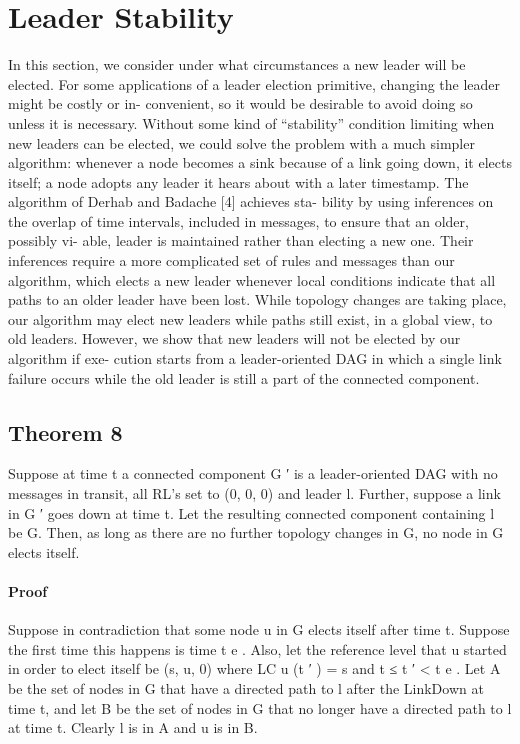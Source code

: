 \documentclass{article}
\begin{document}
\section{Leader Stability}
In this section, we consider under what circumstances a
new leader will be elected. For some applications of a leader
election primitive, changing the leader might be costly or in-
convenient, so it would be desirable to avoid doing so unless
it is necessary. Without some kind of “stability” condition
limiting when new leaders can be elected, we could solve
the problem with a much simpler algorithm: whenever a
node becomes a sink because of a link going down, it elects
itself; a node adopts any leader it hears about with a later
timestamp.
The algorithm of Derhab and Badache [4] achieves sta-
bility by using inferences on the overlap of time intervals,
included in messages, to ensure that an older, possibly vi-
able, leader is maintained rather than electing a new one.
Their inferences require a more complicated set of rules
and messages than our algorithm, which elects a new leader
whenever local conditions indicate that all paths to an older
leader have been lost. While topology changes are taking
place, our algorithm may elect new leaders while paths still
exist, in a global view, to old leaders. However, we show
that new leaders will not be elected by our algorithm if exe-
cution starts from a leader-oriented DAG in which a single
link failure occurs while the old leader is still a part of the
connected component.
\subsection{Theorem 8}
Suppose at time t a connected component G ′ is
a leader-oriented DAG with no messages in transit, all RL’s
set to (0, 0, 0) and leader l. Further, suppose a link in G ′
goes down at time t. Let the resulting connected component
containing l be G. Then, as long as there are no further
topology changes in G, no node in G elects itself.
\paragraph{Proof}
Suppose in contradiction that some node u in G
elects itself after time t. Suppose the first time this happens
is time t e . Also, let the reference level that u started in order
to elect itself be (s, u, 0) where LC u (t ′ ) = s and t ≤ t ′ < t e .
Let A be the set of nodes in G that have a directed path
to l after the LinkDown at time t, and let B be the set of
nodes in G that no longer have a directed path to l at time
t. Clearly l is in A and u is in B.
\end{document}

